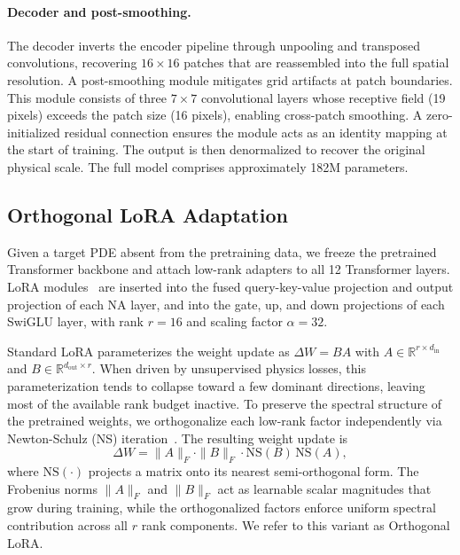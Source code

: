 \documentclass{article}
\begin{document}
\paragraph{Decoder and post-smoothing.}
The decoder inverts the encoder pipeline through unpooling and transposed convolutions, recovering $16 \times 16$ patches that are reassembled into the full spatial resolution. A post-smoothing module mitigates grid artifacts at patch boundaries. This module consists of three $7 \times 7$ convolutional layers whose receptive field (19 pixels) exceeds the patch size (16 pixels), enabling cross-patch smoothing. A zero-initialized residual connection ensures the module acts as an identity mapping at the start of training. The output is then denormalized to recover the original physical scale. The full model comprises approximately 182M parameters.

\subsection{Orthogonal LoRA Adaptation}
\label{sec:orthlora}

Given a target PDE absent from the pretraining data, we freeze the pretrained Transformer backbone and attach low-rank adapters to all 12 Transformer layers. LoRA modules~\cite{hu2022lora} are inserted into the fused query-key-value projection and output projection of each NA layer, and into the gate, up, and down projections of each SwiGLU layer, with rank $r\!=\!16$ and scaling factor $\alpha\!=\!32$.

Standard LoRA parameterizes the weight update as $\Delta W = BA$ with $A \in \mathbb{R}^{r \times d_{\mathrm{in}}}$ and $B \in \mathbb{R}^{d_{\mathrm{out}} \times r}$. When driven by unsupervised physics losses, this parameterization tends to collapse toward a few dominant directions, leaving most of the available rank budget inactive. To preserve the spectral structure of the pretrained weights, we orthogonalize each low-rank factor independently via Newton-Schulz (NS) iteration~\cite{jordan2024muon}. The resulting weight update is
\begin{equation}
\Delta W = \|A\|_F \cdot \|B\|_F \cdot \mathrm{NS}(B)\,\mathrm{NS}(A),
\end{equation}
where $\mathrm{NS}(\cdot)$ projects a matrix onto its nearest semi-orthogonal form. The Frobenius norms $\|A\|_F$ and $\|B\|_F$ act as learnable scalar magnitudes that grow during training, while the orthogonalized factors enforce uniform spectral contribution across all $r$ rank components. We refer to this variant as Orthogonal LoRA.
\end{document}
